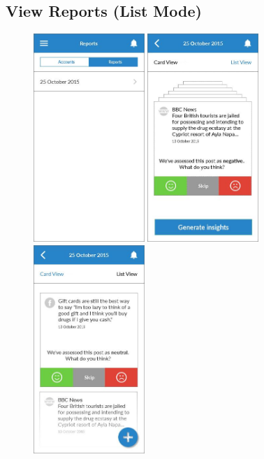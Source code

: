 \clearpage

\subsection{View Reports (List Mode)}

\begin{figure}
  \subfigures
  \centering
  \begin{minipage}{4.6cm}
    \centering
    \includegraphics[width=4.2cm]{inc/ui_report_list_mode_step1.jpg}
    \caption{}
    \label{fig:ui_report_list_mode_step1}
  \end{minipage}
  \begin{minipage}{4.6cm}
    \centering
    \includegraphics[width=4.2cm]{inc/ui_report_list_mode_step2.jpg}
    \caption{}
    \label{fig:ui_report_list_mode_step2}
  \end{minipage}
  \begin{minipage}{4.6cm}
    \centering
    \includegraphics[width=4.2cm]{inc/ui_report_list_mode_step3.jpg}

\end{minipage}
\end{figure}
